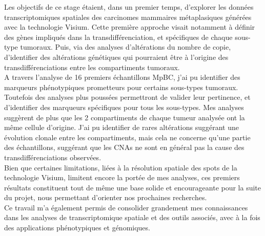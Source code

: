 \documentclass[11pt]{article}
\begin{document}
Les objectifs de ce stage étaient, dans un premier temps, d’explorer les données transcriptomiques spatiales des carcinomes mammaires métaplasiques générées avec la technologie Visium. Cette première approche visait notamment à définir des gènes impliqués dans la transdifférenciation, et spécifiques de chaque sous-type tumoraux. Puis, via des analyses d’altérations du nombre de copie, d’identifier des altérations génétiques qui pourraient être à l’origine des transdifférenciations entre les compartiments tumoraux.\\
A travers l’analyse de 16 premiers échantillons MpBC, j’ai pu identifier des marqueurs phénotypiques prometteurs pour certains sous-types tumoraux. Toutefois des analyses plus poussées permettront de valider leur pertinence, et d’identifier des marqueurs spécifiques pour tous les sous-types. Mes analyses suggèrent de plus que les 2 compartiments de chaque tumeur analysée ont la même cellule d’origine. J’ai pu identifier de rares altérations suggérant une évolution clonale entre les compartiments, mais cela ne concerne qu’une partie des échantillons, suggérant que les CNAs ne sont en général pas la cause des transdifférenciations observées.\\
Bien que certaines limitations, liées à la résolution spatiale des spots de la technologie Visium, limitent encore la portée de mes analyses, ces premiers résultats constituent tout de même une base solide et encourageante pour la suite du projet, nous permettant d’orienter nos prochaines recherches.\\
Ce travail m’a également permis de consolider grandement mes connaissances dans les analyses de transcriptomique spatiale et des outils associés, avec à la fois des applications phénotypiques et génomiques.


\newpage



\end{document}

